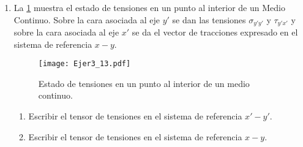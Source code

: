\documentclass[../notas medios.tex]{subfiles}
\begin{document}
\begin{enumerate}
%
\item \label{punto13} La \cref{esta:tensiopoint} muestra el estado de
tensiones en un punto al interior de un Medio Continuo. Sobre la cara asociada al eje $y'$ se dan las tensiones $\sigma_{y'y'}$ y $\tau_{y'x'}$ y sobre la cara asociada al eje $x'$ se da el vector de tracciones expresado en el sistema de referencia $x-y$.\\
%
\begin{figure}[H]
	\centering
	\texttt{[image: Ejer3\_13.pdf]}
	\caption{Estado de tensiones en un punto al interior de un medio continuo.}
	\label{esta:tensiopoint}
\end{figure}

\begin{enumerate}
	\item Escribir el tensor de tensiones en el sistema de referencia $x'-y'$.
	\item Escribir el tensor de tensiones en el sistema de referencia $x-y$.
\end{enumerate}


\end{enumerate}
\end{document}
